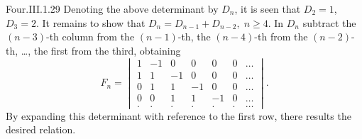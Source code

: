 \begin{ans}{Four.III.1.29}
      \answerasgiven %
      Denoting the above determinant by \( D_n \), it is seen that
      \( D_2=1 \), \( D_3=2 \).
      It remains to show that \( D_n=D_{n-1}+D_{n-2},\; n\geq 4 \).
      In \( D_n \) subtract the \( (n-3) \)-th column from the \( (n-1) \)-th,
      the \( (n-4) \)-th from the \( (n-2) \)-th, \ldots, the first from
      the third, obtaining
      \begin{equation*}
        F_n=
        \begin{vmatrix}
          1  &-1  &0  &0   &0  &0   &\ldots  \\
          1  &1   &-1 &0   &0  &0   &\ldots  \\
          0  &1   &1  &-1  &0  &0   &\ldots  \\
          0  &0   &1  &1   &-1 &0   &\ldots  \\
          .  &.   &.  &.   &.  &.   &\ldots
        \end{vmatrix}.
      \end{equation*}
      By expanding this determinant with reference to the first row, there
      results the desired relation.
    
\end{ans}
